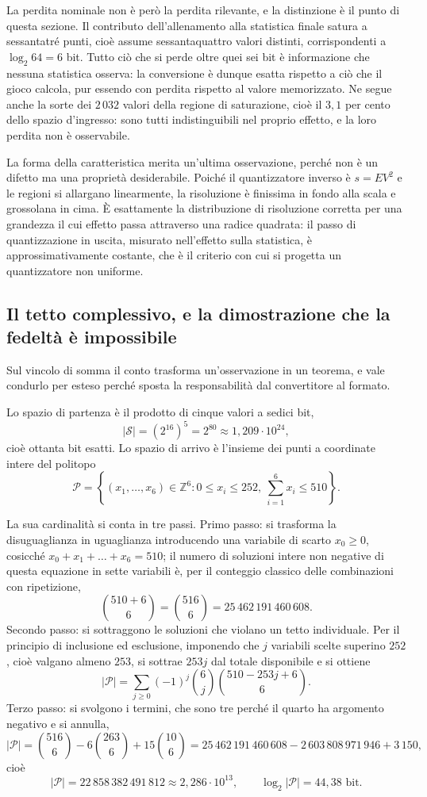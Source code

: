 La perdita nominale non è però la perdita rilevante, e la distinzione è il punto di questa sezione. Il contributo dell'allenamento alla statistica finale satura a sessantatré punti, cioè assume sessantaquattro valori distinti, corrispondenti a $\log_2 64 = 6$ bit. Tutto ciò che si perde oltre quei sei bit è informazione che nessuna statistica osserva: la conversione è dunque esatta rispetto a ciò che il gioco calcola, pur essendo con perdita rispetto al valore memorizzato. Ne segue anche la sorte dei $2\,032$ valori della regione di saturazione, cioè il $3{,}1$ per cento dello spazio d'ingresso: sono tutti indistinguibili nel proprio effetto, e la loro perdita non è osservabile.

La forma della caratteristica merita un'ultima osservazione, perché non è un difetto ma una proprietà desiderabile. Poiché il quantizzatore inverso è $s = EV^2$ e le regioni si allargano linearmente, la risoluzione è finissima in fondo alla scala e grossolana in cima. È esattamente la distribuzione di risoluzione corretta per una grandezza il cui effetto passa attraverso una radice quadrata: il passo di quantizzazione in uscita, misurato nell'effetto sulla statistica, è approssimativamente costante, che è il criterio con cui si progetta un quantizzatore non uniforme.

\subsection{Il tetto complessivo, e la dimostrazione che la fedeltà è impossibile}

Sul vincolo di somma il conto trasforma un'osservazione in un teorema, e vale condurlo per esteso perché sposta la responsabilità dal convertitore al formato.

Lo spazio di partenza è il prodotto di cinque valori a sedici bit,
\[
|\mathcal{S}| = (2^{16})^5 = 2^{80} \approx 1{,}209 \cdot 10^{24},
\]
cioè ottanta bit esatti. Lo spazio di arrivo è l'insieme dei punti a coordinate intere del politopo
\[
\mathcal{P} = \left\{ (x_1, \dots, x_6) \in \mathbb{Z}^6 : 0 \le x_i \le 252,\ \sum_{i=1}^{6} x_i \le 510 \right\}.
\]

La sua cardinalità si conta in tre passi. Primo passo: si trasforma la disuguaglianza in uguaglianza introducendo una variabile di scarto $x_0 \ge 0$, cosicché $x_0 + x_1 + \dots + x_6 = 510$; il numero di soluzioni intere non negative di questa equazione in sette variabili è, per il conteggio classico delle combinazioni con ripetizione,
\[
\binom{510 + 6}{6} = \binom{516}{6} = 25\,462\,191\,460\,608.
\]
Secondo passo: si sottraggono le soluzioni che violano un tetto individuale. Per il principio di inclusione ed esclusione, imponendo che $j$ variabili scelte superino $252$, cioè valgano almeno $253$, si sottrae $253j$ dal totale disponibile e si ottiene
\[
|\mathcal{P}| = \sum_{j \ge 0} (-1)^j \binom{6}{j} \binom{510 - 253j + 6}{6}.
\]
Terzo passo: si svolgono i termini, che sono tre perché il quarto ha argomento negativo e si annulla,
\[
|\mathcal{P}| = \binom{516}{6} - 6\binom{263}{6} + 15\binom{10}{6}
= 25\,462\,191\,460\,608 - 2\,603\,808\,971\,946 + 3\,150,
\]
cioè
\[
|\mathcal{P}| = 22\,858\,382\,491\,812 \approx 2{,}286 \cdot 10^{13}, \qquad \log_2 |\mathcal{P}| = 44{,}38 \text{ bit}.
\]

